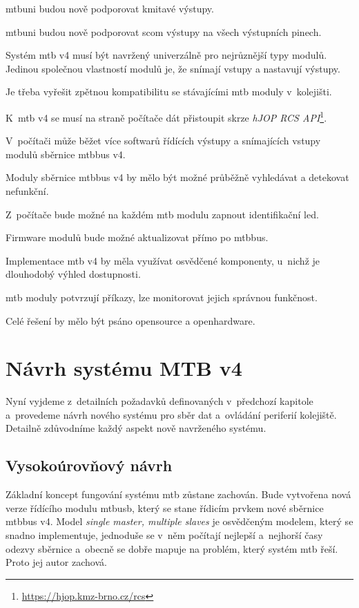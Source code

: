 \begin{compactenum}
\item \gls{mtbuni} budou nově podporovat kmitavé výstupy.
\item \gls{mtbuni} budou nově podporovat \gls{scom} výstupy na všech
	výstupních pinech.
\item Systém \gls{mtb} v4 musí být navržený univerzálně pro nejrůznější typy
	modulů. Jedinou společnou vlastností modulů je, že snímají vstupy a nastavují
	výstupy.
\item Je třeba vyřešit zpětnou kompatibilitu se stávajícími \gls{mtb} moduly
	v~kolejišti.
\item K~\gls{mtb} v4 se musí na straně počítače dát přistoupit skrze
	\textit{hJOP RCS API}\footnote{\url{https://hjop.kmz-brno.cz/rcs}}.
\item V~počítači může běžet více softwarů řídících výstupy a snímajících vstupy
	modulů sběrnice \gls{mtbbus} v4.
\item Moduly sběrnice \gls{mtbbus} v4 by mělo být možné průběžně vyhledávat
	a detekovat nefunkční.
\item Z~počítače bude možné na každém \gls{mtb} modulu zapnout identifikační \gls{led}.
\item Firmware modulů bude možné aktualizovat přímo po \gls{mtbbus}.
\item Implementace \gls{mtb} v4 by měla využívat osvědčené komponenty, u~nichž
	je dlouhodobý výhled dostupnosti.
\item \gls{mtb} moduly potvrzují příkazy, lze monitorovat jejich správnou funkčnost.
\item Celé řešení by mělo být psáno opensource a openhardware.
\end{compactenum}


\section{Návrh systému MTB v4}

Nyní vyjdeme z~detailních požadavků definovaných v~předchozí kapitole
a~provedeme návrh nového systému pro sběr dat a~ovládání periferií kolejiště.
Detailně zdůvodníme každý aspekt nově navrženého systému.

\subsection{Vysokoúrovňový návrh}

Základní koncept fungování systému \gls{mtb}  zůstane zachován. Bude vytvořena nová verze řídícího modulu
\gls{mtbusb}, který se stane řídicím prvkem nové sběrnice \gls{mtbbus} v4.
Model \textit{single master, multiple slaves} je osvědčeným modelem, který se
snadno implementuje, jednoduše se v~něm počítají nejlepší a~nejhorší časy odezvy
sběrnice a~obecně se dobře mapuje na problém, který systém \gls{mtb} řeší.
Proto jej autor zachová.


